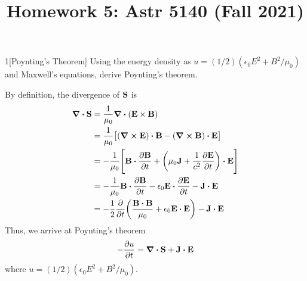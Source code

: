 \documentclass[12pt]{article}
\title{Homework 5: Astr 5140 (Fall 2021)}
\begin{document}
\maketitle
\begin{problem}{1}[Poynting's Theorem]
Using the energy density as $u=(1 /2)(\epsilon_0E^2+B^2 /\mu_0)$ and Maxwell's
equations, derive Poynting's theorem.
\begin{solution}
By definition, the divergence of $\vb{S}$ is
\begin{align}
    \div{\vb{S}}
    &=\frac1{\mu_0}\div{\qty(\vb{E}\times\vb{B})}\notag\\
    &=\frac1{\mu_0}\qty[(\curl{\vb{E}})\vdot\vb{B}-(\curl{\vb{B}})\vdot\vb{E}]\notag\\
    &=-\frac1{\mu_0}\qty[\vb{B}\vdot\frac{\partial\vb{B}}{\partial t}
    +\qty(\mu_0\vb{J}+\frac1{c^2}\frac{\partial\vb{E}}{\partial
    t})\vdot\vb{E}]\notag\\
    &=-\frac1{\mu_0}\vb{B}\vdot\frac{\partial\vb{B}}{\partial t}
    -\epsilon_0\vb{E}\vdot\frac{\partial\vb{E}}{\partial t}
    -\vb{J}\vdot\vb{E}\notag\\
    &=-\frac12\frac{\partial}{\partial
    t}\qty(\frac{\vb{B}\vdot\vb{B}}{\mu_0}+\epsilon_0\vb{E}\vdot\vb{E})
    -\vb{J}\vdot\vb{E}
\end{align}
Thus, we arrive at Poynting's theorem
\begin{equation}
    -\frac{\partial u}{\partial t}=\div{\vb{S}}+\vb{J}\vdot\vb{E}
\end{equation}
where $u=(1 /2)(\epsilon_0E^2+B^2 /\mu_0)$.
\end{solution}
\end{problem}
\end{document}
